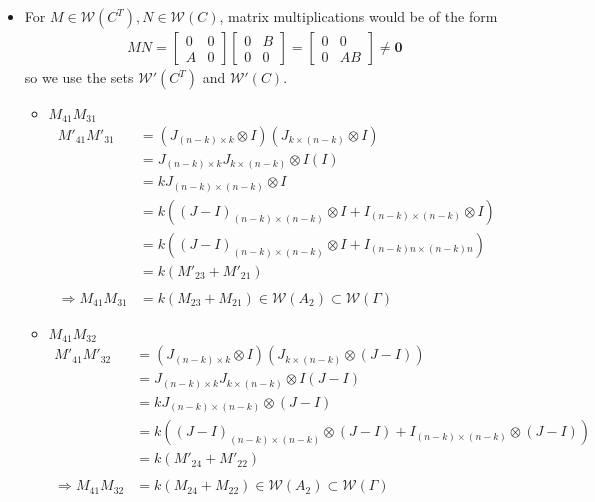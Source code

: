 \documentclass{article}
\begin{document}
\begin{itemize}
\begin{itemize}
        \item For $M\in\mathcal{W}(C^T),N \in \mathcal{W}(C)$, matrix multiplications would be of the form \\
        \begin{align*}
            MN = \begin{bmatrix}
                0 & 0 \\ A & 0
            \end{bmatrix}\begin{bmatrix}
                0&B\\0&0
            \end{bmatrix} = \begin{bmatrix}
                0&0\\0&AB
            \end{bmatrix} \neq \mathbf{0}
        \end{align*}
        so we use the sets $\mathcal{W'}(C^T)$ and $\mathcal{W'}(C)$. \\
        \begin{itemize}
            \item $M_{41}M_{31}$
            \begin{align*}
                M'_{41}M'_{31}
                &= (J_{(n-k)\times k}\otimes I)(J_{k\times (n-k)}\otimes I) \\
                &= J_{(n-k)\times k}J_{k\times (n-k)} \otimes I(I) \\
                &= kJ_{(n-k)\times (n-k)}\otimes I \\
                &= k((J-I)_{(n-k)\times (n-k)}\otimes I + I_{(n-k)\times (n-k)}\otimes I )\\
                &= k((J-I)_{(n-k)\times (n-k)}\otimes I + I_{(n-k)n\times (n-k)n} )\\
                &= k(M'_{23} + M'_{21}) \\\\
                \Rightarrow M_{41}M_{31} &= k(M_{23} + M_{21}) \in \mathcal{W}(A_2)\subset\mathcal{W}(\Gamma)
            \end{align*}
            
            \item $M_{41}M_{32}$
            \begin{align*}
                M'_{41}M'_{32}
                &= (J_{(n-k)\times k}\otimes I)(J_{k\times (n-k)}\otimes (J-I)) \\
                &= J_{(n-k)\times k}J_{k\times (n-k)} \otimes I(J-I) \\
                &= kJ_{(n-k)\times (n-k)}\otimes (J-I) \\
                &= k((J-I)_{(n-k)\times (n-k)}\otimes (J-I) + I_{(n-k)\times (n-k)}\otimes (J-I) )\\
                &= k(M'_{24} + M'_{22}) \\\\
                \Rightarrow M_{41}M_{32} &= k(M_{24} + M_{22}) \in \mathcal{W}(A_2)\subset\mathcal{W}(\Gamma)
            \end{align*}
            

\end{itemize}
\end{itemize}
\end{itemize}
\end{document}
